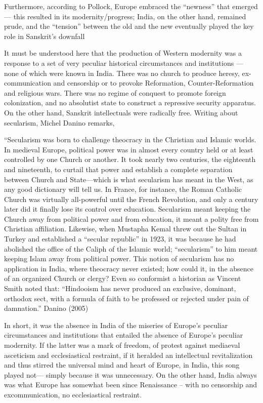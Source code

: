 Furthermore, according to Pollock, Europe embraced the “newness” that emerged— this resulted in its modernity/progress; India, on the other hand, remained prude, and the “tension” between the old and the new eventually played the key role in Sanskrit’s downfall
\begin{myquote}
It must be understood here that the production of Western modernity was a response to a set of very peculiar historical circumstances and institutions — none of which were known in India. There was no church to produce heresy, ex-communication and censorship or to provoke Reformation, Counter-Reformation and religious wars. There was no regime of conquest to promote foreign colonization, and no absolutist state to construct a repressive security apparatus. On the other hand, Sanskrit intellectuals were {\rm radically free}. Writing about secularism, Michel Danino remarks,

“Secularism was born to challenge theocracy in the Christian and Islamic worlds. In medieval Europe, political power was in almost every country held or at least controlled by one Church or another. It took nearly two centuries, the eighteenth and nineteenth, to curtail that power and establish a complete separation between Church and State—which is what secularism has meant in the West, as any good dictionary will tell us. In France, for instance, the Roman Catholic Church was virtually all-powerful until the French Revolution, and only a century later did it finally lose its control over education. Secularism meant keeping the Church away from political power and from education, it meant a polity free from Christian affiliation. Likewise, when Mustapha Kemal threw out the Sultan in Turkey and established a “secular republic” in 1923, it was because he had abolished the office of the Caliph of the Islamic world; “secularism” to him meant keeping Islam away from political power.  This notion of secularism has no application in India, where theocracy never existed; how could it, in the absence of an organized Church or
clergy? Even so conformist a historian as Vincent Smith noted that: “Hindooism has never produced an exclusive, dominant, orthodox sect, with a formula of faith to be professed or rejected under pain of damnation.”	\hfill{Danino (2005)}
\end{myquote}

In short, it was the absence in India of the miseries of Europe’s peculiar circumstances and institutions that entailed the absence of Europe’s peculiar modernity. If the latter was a mark of freedom, of protest against mediaeval asceticism and ecclesiastical restraint, if it heralded an intellectual revitalization and thus stirred the universal mind and heart of Europe, in India, this song played not— simply because it was unnecessary. On the other hand, India always was what Europe has somewhat been since Renaissance – with no censorship and excommunication, no ecclesiastical restraint.

